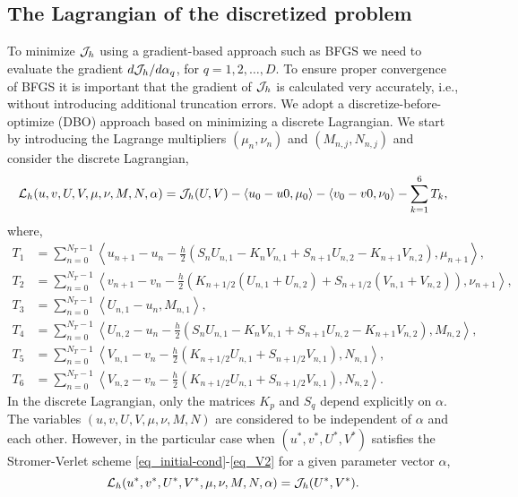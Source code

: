 \documentclass[11pt]{article}
\begin{document}
\subsection{The Lagrangian of the discretized problem}
To minimize ${\cal J}_h$ using a gradient-based approach such as BFGS we need to evaluate the gradient
$d {\cal J}_h/ d\alpha_q$, for $q=1,2,\ldots,D$. To ensure proper convergence of BFGS it is important that the
gradient of ${\cal J}_h$ is calculated very accurately, i.e., without introducing additional truncation errors. We
adopt a discretize-before-optimize (DBO) approach based on minimizing a discrete Lagrangian. We start by
introducing the Lagrange multipliers $(\mu_n,\nu_n)$ and $(M_{n,j}, N_{n,j})$ and consider the discrete Lagrangian,
\begin{equation}
{\cal L}_h(u,v,U,V, \mu,\nu,M,N,\alpha) = {\cal J}_h(U,V) - \langle u_0 - u0, \mu_0\rangle - \langle
v_0 - v0, \nu_0\rangle - \sum_{k=1}^6 T_k,
\end{equation}
where,
\begin{align}
T_1 &= \sum_{n=0}^{N_T-1} \left\langle u_{n+1} - u_n - \frac{h}{2}\left(S_nU_{n,1} - K_nV_{n,1} + S_{n+1}U_{n,2} - K_{n+1}V_{n,2}
  \right), \mu_{n+1} \right\rangle,\\
T_2 &= \sum_{n=0}^{N_T-1} \left\langle v_{n+1} - v_n - \frac{h}{2}\left(K_{n+1/2} \left(U_{n,1} + U_{n,2}\right) + S_{n+1/2}\left(
  V_{n,1} +  V_{n,2}\right) \right), \nu_{n+1} \right\rangle,\\
T_3 &= \sum_{n=0}^{N_T-1} \left\langle U_{n,1} - u_n, M_{n,1} \right\rangle,\\
T_4 &= \sum_{n=0}^{N_T-1} \left\langle U_{n,2} - u_n - \frac{h}{2}\left(S_nU_{n,1} - K_nV_{n,1} + S_{n+1}U_{n,2} -
  K_{n+1}V_{n,2} \right), M_{n,2} \right\rangle,\\
T_5 &= \sum_{n=0}^{N_T-1} \left\langle V_{n,1} - v_n - \frac{h}{2}\left(  K_{n+1/2} U_{n,1} + S_{n+1/2} V_{n,1} \right), N_{n,1} \right\rangle,\\
T_6 &= \sum_{n=0}^{N_T-1} \left\langle V_{n,2} - v_n - \frac{h}{2}\left(  K_{n+1/2} U_{n,1} + S_{n+1/2} V_{n,1} \right), N_{n,2} \right\rangle.
\end{align}
In the discrete Lagrangian, only the matrices $K_p$ and $S_q$ depend explicitly on $\alpha$. The
variables $(u,v,U,V, \mu,\nu,M,N)$ are considered to be independent of $\alpha$ and each
other. However, in the particular case when $(u^*,v^*,U^*,V^*)$ satisfies the Stromer-Verlet scheme
\eqref{eq_initial-cond}-\eqref{eq_V2} for a given parameter vector $\alpha$,
\[
{\cal L}_h(u^*,v^*,U^*,V^*, \mu,\nu,M,N,\alpha) = {\cal J}_h(U^*,V^*).
\]
\end{document}
